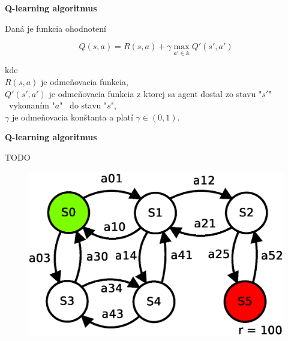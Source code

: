 \documentclass[xcolor=dvipsnames]{beamer}
\begin{document}
\begin{frame}{\bf Q-learning algoritmus}

Daná je funkcia ohodnotení

\begin{equation} \label{eu_eqn}
Q(s,a) = R(s,a) + \gamma \max_{a' \in \mathbb{A}} Q'(s', a')
\end{equation}

kde \\
$R(s,a)$ je odmeňovacia funkcia, \\
$Q'(s',a')$ je odmeňovacia funkcia z ktorej sa agent dostal zo stavu "$s'$" \ vykonaním "$a$" \ do
stavu "$s$", \\
$\gamma$ je odmeňovacia konštanta a platí $\gamma \in (0, 1)$.
\end{frame}



\begin{frame}{\bf Q-learning algoritmus}

TODO
\begin{figure}[!htb]
\includegraphics[scale=.5]{../diagrams/q_learning_table_01.eps}
\end{figure}

\end{frame}
\end{document}

